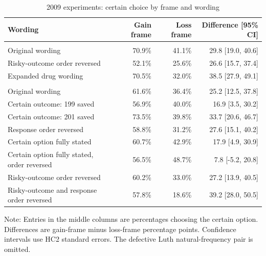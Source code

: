 \begin{table}[H]
\centering
\caption{\label{tab:effects}2009 experiments: certain choice by frame and wording}
\centering
\begin{threeparttable}
\begin{tabular}[t]{lrrr}
\toprule
Wording & Gain frame & Loss frame & Difference [95\% CI]\\
\midrule
\addlinespace[0.3em]
\multicolumn{4}{l}{\textbf{FFRISP probability panel}}\\
\hspace{1em}Original wording & 70.9\% & 41.1\% & 29.8 [19.0, 40.6]\\
\hspace{1em}Risky-outcome order reversed & 52.1\% & 25.6\% & 26.6 [15.7, 37.4]\\
\hspace{1em}Expanded drug wording & 70.5\% & 32.0\% & 38.5 [27.9, 49.1]\\
\addlinespace[0.3em]
\multicolumn{4}{l}{\textbf{Luth volunteer panel}}\\
\hspace{1em}Original wording & 61.6\% & 36.4\% & 25.2 [12.5, 37.8]\\
\hspace{1em}Certain outcome: 199 saved & 56.9\% & 40.0\% & 16.9 [3.5, 30.2]\\
\hspace{1em}Certain outcome: 201 saved & 73.5\% & 39.8\% & 33.7 [20.6, 46.7]\\
\hspace{1em}Response order reversed & 58.8\% & 31.2\% & 27.6 [15.1, 40.2]\\
\hspace{1em}Certain option fully stated & 60.7\% & 42.9\% & 17.9 [4.9, 30.9]\\
\hspace{1em}Certain option fully stated, order reversed & 56.5\% & 48.7\% & 7.8 [-5.2, 20.8]\\
\hspace{1em}Risky-outcome order reversed & 60.2\% & 33.0\% & 27.2 [13.9, 40.5]\\
\hspace{1em}Risky-outcome and response order reversed & 57.8\% & 18.6\% & 39.2 [28.0, 50.5]\\
\bottomrule
\end{tabular}
\begin{tablenotes}[para]
\item Note: Entries in the middle columns are percentages choosing the certain option. Differences are gain-frame minus loss-frame percentage points. Confidence intervals use HC2 standard errors. The defective Luth natural-frequency pair is omitted.
\end{tablenotes}
\end{threeparttable}
\end{table}
